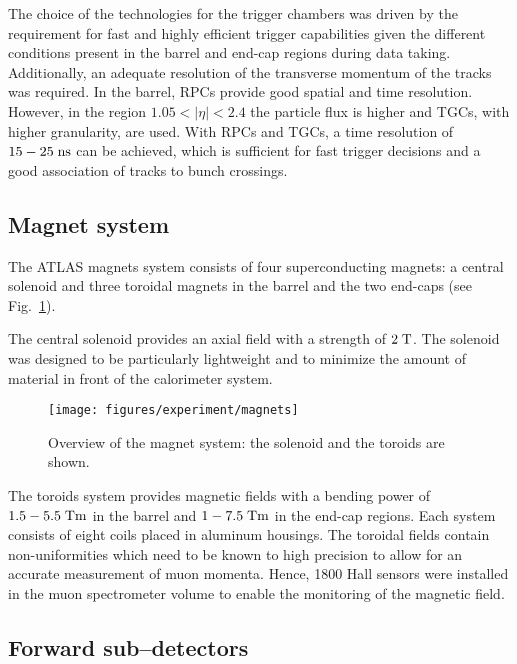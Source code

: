 The choice of the technologies for the trigger chambers was driven 
by the requirement for fast and highly efficient trigger capabilities
given the different conditions present in the barrel and end-cap
regions during data taking. 
Additionally, an adequate resolution of the transverse momentum of the
tracks was required. 
In the barrel, RPCs provide good spatial and time resolution.
However, in the region \mbox{$1.05 < |\eta| < 2.4$}  the particle flux
is higher and TGCs, with higher granularity, are used.
With RPCs and TGCs, a time resolution of \mbox{$15 - 25 \; \mathrm{ns}$} can be
achieved, 
which is sufficient for fast trigger decisions and a good association of
tracks to bunch crossings.

\subsection{Magnet system}
\label{sec:magnets}

The ATLAS magnets system consists of four superconducting
magnets: a central solenoid and three toroidal magnets in the barrel and the
two end-caps (see Fig.~\ref{fig:magnets}).

The central solenoid provides an axial field with a strength of \mbox{$2 \; \mathrm{T}$}.
The solenoid was designed to be particularly lightweight and to
minimize the amount of material in front of the calorimeter system.

\begin{figure}[ht]
\begin{center}
\texttt{[image: figures/experiment/magnets]}
\caption[Overview of the magnet system]{
  Overview of the magnet system:
  the solenoid and the toroids are shown.}
\label{fig:magnets}
\end{center}
\end{figure}

The toroids system provides magnetic fields with a bending power
of \mbox{$1.5 - 5.5 \; \mathrm{Tm}$} in the barrel and \mbox{$1 - 7.5 \; \mathrm{Tm}$} in the end-cap regions.
Each system consists of eight coils placed in aluminum housings.
The toroidal fields contain non-uniformities which need to be known to
high precision to allow for an accurate measurement of muon momenta.
Hence, 1800 Hall sensors were installed in the muon spectrometer 
volume to enable the monitoring of the magnetic field.


\subsection{Forward sub--detectors}
\label{sec:forward}

